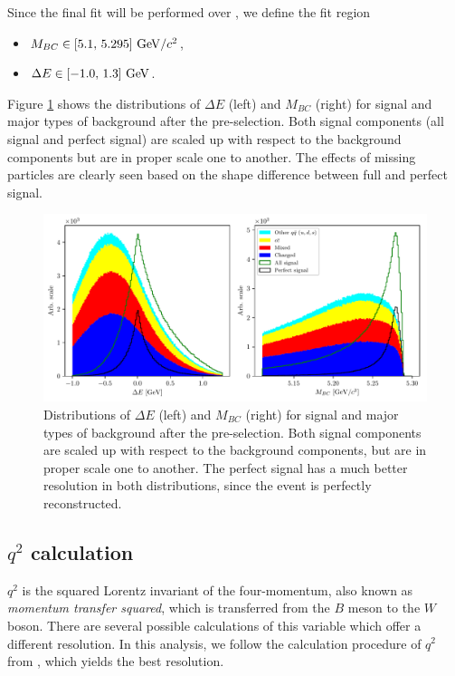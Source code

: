 Since the final fit will be performed over \vars, we define the fit region
\begin{itemize}
	\item $M_{BC} \in [5.1,\,5.295]\mathrm{~GeV}/c^2$,
	\item $\Delta E \in [-1.0,\,1.3]\mathrm{~GeV}$.
\end{itemize}

Figure \ref{fig:mbc_de_pre} shows the distributions of $\Delta E$ (left) and $M_{BC}$ (right) for signal and major types of background after the pre-selection. Both signal components (all signal and perfect signal) are scaled up with respect to the background components but are in proper scale one to another. The effects of missing particles are clearly seen based on the shape difference between full and perfect signal.

\begin{figure}[H]
	\centering
	\captionsetup{width=0.8\linewidth}
	\includegraphics[width=\linewidth]{fig/mbc_de_pre}
	\caption{Distributions of $\Delta E$ (left) and $M_{BC}$ (right) for signal and major types of background after the pre-selection. Both signal components are scaled up with respect to the background components, but are in proper scale one to another. The perfect signal has a much better resolution in both distributions, since the event is perfectly reconstructed.}
	\label{fig:mbc_de_pre}
\end{figure}

\subsection{\texorpdfstring{$q^2$}{q2} calculation}
$q^2$ is the squared Lorentz invariant of the four-momentum, also known as \textit{momentum transfer squared}, which is transferred from the $B$ meson to the $W$ boson. There are several possible calculations of this variable which offer a different resolution. In this analysis, we follow the calculation procedure of $q^2$ from \cite{VubCLEO}, which yields the best resolution.

